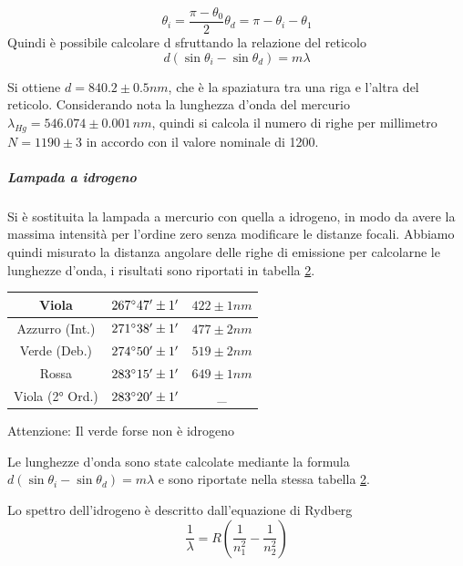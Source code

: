 \documentclass[10pt,a4paper]{article}
\begin{document}
\begin{table}[!htb]
\begin{equation}
\theta_i=\frac{\pi-\theta_0}{2}
\theta_d=\pi-\theta_i-\theta_1
\end{equation}
Quindi è possibile calcolare d sfruttando la relazione del reticolo 
\begin{equation}
d(\sin{\theta_i}-\sin{\theta_d})=m\lambda
\end{equation}


Si ottiene $d = 840.2 \pm 0.5 nm$, che è la spaziatura tra una riga e l'altra del reticolo. Considerando nota la lunghezza d'onda del mercurio $\lambda_{Hg}=546.074\pm0.001\,nm$, quindi si calcola il numero di righe per millimetro $N = 1190 \pm 3$ in accordo con il valore nominale di 1200.


\subparagraph{Lampada a idrogeno}
Si è sostituita la lampada a mercurio con quella a idrogeno, in modo da avere la massima intensità per l'ordine zero senza modificare le distanze focali. Abbiamo quindi misurato la distanza angolare delle righe di emissione per calcolarne le lunghezze d'onda, i risultati sono riportati in tabella \ref{idrogeno}.\\

\begin{table}[!htb]
\centering
\begin{tabular}{|c|c|c|}
\hline 
Viola & $267 \degree 47' \pm 1'$ & $422 \pm 1 nm$ \\ 
\hline 
Azzurro (Int.) & $271 \degree 38' \pm 1'$ & $477 \pm 2 nm$ \\ 
\hline 
Verde (Deb.) & $274 \degree 50' \pm 1'$ & $519 \pm 2 nm$ \\ 
\hline 
Rossa & $283 \degree 15' \pm 1'$ & $649 \pm 1 nm$ \\ 
\hline 
Viola (2° Ord.) & $283\degree 20' \pm 1'$ & _ \\ 
\hline 
\end{tabular} 
\label{idrogeno}
\end{table} 

Attenzione: Il verde forse non è idrogeno

Le lunghezze d'onda sono state calcolate mediante la formula $d(\sin{\theta_i}-\sin{\theta_d})=m\lambda$ e sono riportate nella stessa tabella \ref{idrogeno}.


Lo spettro dell'idrogeno è descritto dall'equazione di Rydberg
\begin{equation}
\frac{1}{\lambda}=R(\frac{1}{n_{1}^2}-\frac{1}{n_{2}^2})
\end{equation}


\end{table}
\end{document}
